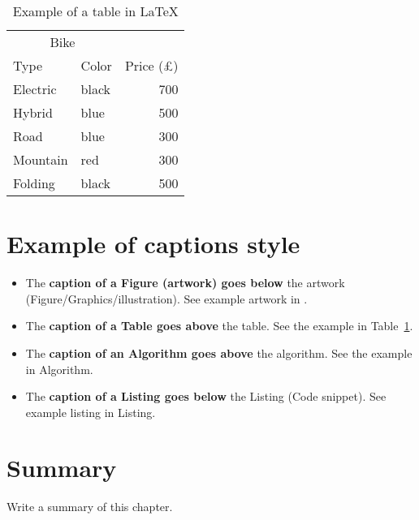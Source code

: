 \begin{table}[h!]
    \centering
    \caption{Example of a table in \LaTeX}
    \label{tab:_ex_tab}
    \begin{tabular}{llr}     
        \toprule
        \multicolumn{2}{c}{Bike} \\
        \cmidrule(r){1-2}
        Type    &  Color & Price (\pounds) \\
        \midrule
        Electric    & black   & 700   \\
        Hybrid      & blue    & 500   \\
        Road        & blue    & 300   \\
        Mountain    & red     & 300   \\
        Folding     & black   & 500   \\
        \bottomrule
    \end{tabular}
\end{table}

\section{Example of captions style}

\begin{itemize}
    \item The \textbf{caption of a Figure (artwork) goes below} the artwork (Figure/Graphics/illustration). See example artwork in . 
    \item  The \textbf{caption of a Table goes above} the table. See the example in Table~\ref{tab:_ex_tab}.
    \item  The \textbf{caption of an Algorithm goes above} the algorithm. See the example in Algorithm.
    \item The \textbf{caption of a Listing goes below} the Listing  (Code snippet). See example listing in Listing. 
\end{itemize} 





\section{Summary}
Write a summary of this chapter.



